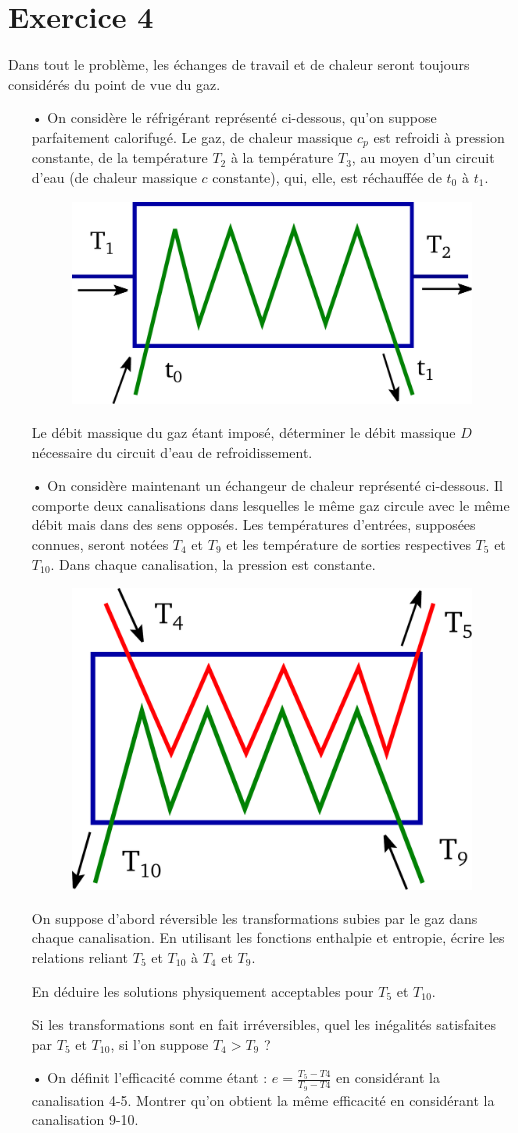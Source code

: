 \documentclass{report}
\begin{document}
\newpage

\section*{Exercice 4}

Dans tout le problème, les échanges de travail et de chaleur seront toujours considérés du point de vue du gaz.
\begin{itemize}

\item[•] On considère le réfrigérant représenté ci-dessous, qu'on suppose parfaitement calorifugé. Le gaz, de chaleur massique $c_{p}$ est refroidi à pression constante, de la température $T_{2}$ à la température $T_{3}$, au moyen d'un circuit d'eau (de chaleur massique $c$ constante), qui, elle, est réchauffée de $t_{0}$ à $t_{1}$.

\begin{figure}[!h]
\centering
\includegraphics[width=0.3\linewidth]{refrigirant.pdf}
\end{figure}

Le débit massique du gaz étant imposé, déterminer le débit massique $D$ nécessaire du circuit d'eau de refroidissement.
\item[•] On considère maintenant un échangeur de chaleur représenté ci-dessous. Il comporte deux canalisations dans lesquelles le même gaz circule avec le même débit mais dans des sens opposés. Les températures d'entrées, supposées connues, seront notées $T_{4}$ et $T_{9}$ et les température de sorties respectives $T_{5}$ et $T_{10}$. Dans chaque canalisation, la pression est constante.
\begin{figure}[!h]
\centering
\includegraphics[width=0.3\linewidth]{echangeur.pdf}
\end{figure}
On suppose d'abord réversible les transformations subies par le gaz dans chaque canalisation. En utilisant les fonctions enthalpie et entropie, écrire les relations reliant $T_{5}$ et $T_{10}$ à $T_{4}$ et $T_{9}$.

En déduire les solutions physiquement acceptables pour $T_{5}$ et $T_{10}$.

Si les transformations sont en fait irréversibles, quel les inégalités satisfaites par $T_{5}$ et $T_{10}$, si l'on suppose $T_{4}>T_{9}$ ?

\item[•] On définit l'efficacité comme étant : $e=\frac{T_{5}-T{4}}{T_{9}-T{4}}$ en considérant la canalisation 4-5. Montrer qu'on obtient la même efficacité en considérant la canalisation 9-10.
\end{itemize}
\end{document}
